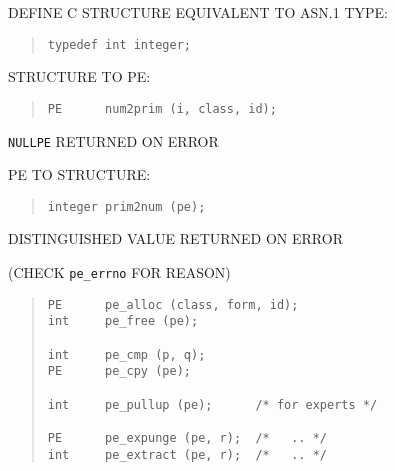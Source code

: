 \begin{bwslide}

\begin{nrtc}
\item	DEFINE C STRUCTURE EQUIVALENT TO ASN.1 TYPE:
\begin{quote}\small\begin{verbatim}
typedef int integer;
\end{verbatim}\end{quote}

\item	STRUCTURE TO PE:
\begin{quote}\small\begin{verbatim}
PE      num2prim (i, class, id);
\end{verbatim}\end{quote}
\verb"NULLPE" RETURNED ON ERROR

\item	PE TO STRUCTURE:
\begin{quote}\small\begin{verbatim}
integer prim2num (pe);
\end{verbatim}\end{quote}
DISTINGUISHED VALUE RETURNED ON ERROR
    \begin{nrtc}
    \item	(CHECK \verb"pe_errno" FOR REASON)
    \end{nrtc}
\end{nrtc}
\end{bwslide}


\begin{bwslide}

\begin{quote}\small\begin{verbatim}
PE      pe_alloc (class, form, id);
int     pe_free (pe);

int     pe_cmp (p, q);
PE      pe_cpy (pe);

int     pe_pullup (pe);      /* for experts */

PE      pe_expunge (pe, r);  /*   .. */
int     pe_extract (pe, r);  /*   .. */
\end{verbatim}\end{quote}
\end{bwslide}


